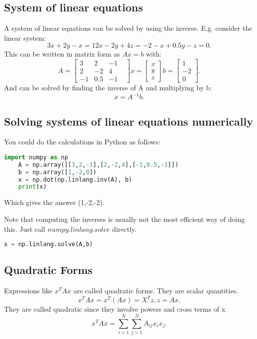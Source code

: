\documentclass[a4paper]{article}
\newcommand{\0}{\mathbb{\emptyset}}
\begin{document}
	\subsection{System of linear equations}
	A system of linear equations can be solved by using the inverse. E.g.
	consider the linear system:
	\[
	3x+2y-x=1
	2x-2y+4z=-2
	-x+0.5y-z=0
	.\] 
	This can be written in matrix form as $Ax=b$ with:
	\[
		A=\begin{bmatrix} 3 & 2 & -1 & \\
		2 & -2 & 4 \\
		-1 & 0.5 & -1\end{bmatrix} 
		x=\begin{bmatrix} x \\ y \\ z \end{bmatrix} 
		b=\begin{bmatrix} 1 \\ -2 \\ 0 \end{bmatrix} 
	.\] 
	And can be solved by finding the inverse of A and multiplying by b:
	\[
		x = A^{-1}b
	.\] 
	\subsection{Solving systems of linear equations numerically}
	You could do the calculations in Python as follows:
	\begin{lstlisting}[language=Python]
	import numpy as np
	A = np.array([[3,2,-1],[2,-2,4],[-1,0.5,-1]])
	b = np.array([1,-2,0])
	x = np.dot(np.linlang.inv(A), b)
	print(x)
	\end{lstlisting}
	Which gives the answer (1,-2,-2). \par
	Note that computing the inverses is usually not the most efficient way
	of doing this. Just call $numpy.linlang.solve$ directly.
	\begin{lstlisting}[language=Python]
	x = np.linlang.solve(A,b)
	\end{lstlisting}
	\subsection{Quadratic Forms}
	Expressions like $x^TAx$ are called quadratic forms. They are scalar
	quantities.
	\[
		x^TAx = x^T(Ax) = X^Tz, z=Ax
	.\] 
	They are called quadratic since they involve powers and cross terms of x
	\[
		x^TAx = \sum_{i=1}^{N}\sum_{j=1}^{N}A_{ij}x_ix_j
	.\] 
\end{document}
